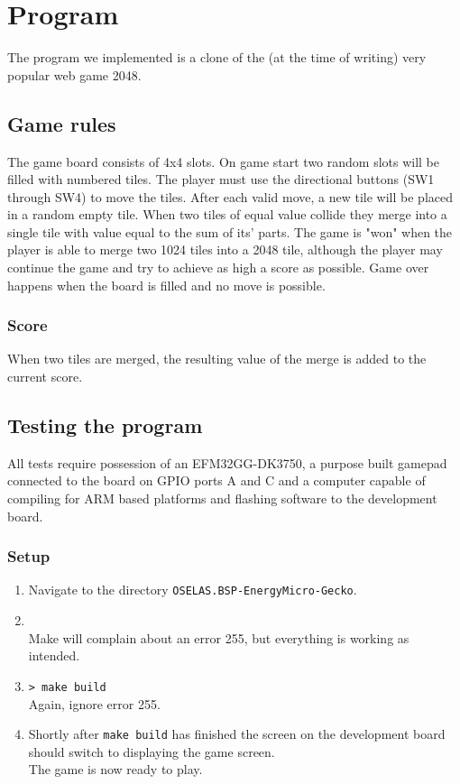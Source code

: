 \section{Program}
The program we implemented is a clone of the (at the time of writing) very popular web game 2048\cite{2048}. 

\subsection{Game rules\label{game_rules}}
The game board consists of 4x4 slots.
On game start two random slots will be filled with numbered tiles.
The player must use the directional buttons (SW1 through SW4) to move the tiles.
After each valid move, a new tile will be placed in a random empty tile.
When two tiles of equal value collide they merge into a single tile with value equal to the sum of its' parts.
The game is "won" when the player is able to merge two 1024 tiles into a 2048 tile, although the player may continue the game and try to achieve as high a score as possible.
Game over happens when the board is filled and no move is possible.

\subsubsection{Score}
When two tiles are merged, the resulting value of the merge is added to the current score.

\subsection{Testing the program}
All tests require possession of an EFM32GG-DK3750, a purpose built gamepad connected to the board on GPIO ports A and C and a computer capable of compiling for ARM based platforms and flashing software to the development board.

\subsubsection{Setup}
\begin{enumerate}
    \item   Navigate to the directory \texttt{OSELAS.BSP-EnergyMicro-Gecko}.
    \item   {}\\
	    Make will complain about an error 255, but everything is working as intended.
    \item   \texttt{> make build}\\
	    Again, ignore error 255.
    \item   Shortly after \texttt{make build} has finished the screen on the development board should switch to displaying the game screen.\\
	    The game is now ready to play.
\end{enumerate}

